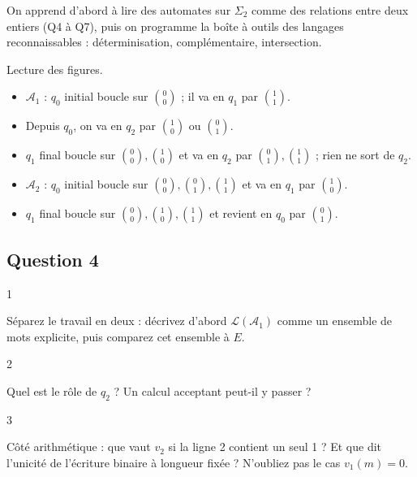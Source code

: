 \documentclass[11pt,a4paper]{article}
\providecommand{\tightlist}{\setlength{\itemsep}{0pt}\setlength{\parskip}{0pt}}
\begin{document}
On apprend d'abord à lire des automates sur \(\Sigma_2\) comme des relations entre deux entiers (Q4 à Q7), puis on programme la boîte à outils des langages reconnaissables : déterminisation, complémentaire, intersection.

Lecture des figures.

\begin{itemize}
\tightlist
\item
  \({\mathcal{A}}_1\) : \(q_0\) initial boucle sur \(\binom00\) ; il va en \(q_1\) par \(\binom11\).
\item
  Depuis \(q_0\), on va en \(q_2\) par \(\binom10\) ou \(\binom01\).
\item
  \(q_1\) final boucle sur \(\binom00,\binom10\) et va en \(q_2\) par \(\binom01,\binom11\) ; rien ne sort de \(q_2\).
\item
  \({\mathcal{A}}_2\) : \(q_0\) initial boucle sur \(\binom00,\binom01,\binom11\) et va en \(q_1\) par \(\binom10\).
\item
  \(q_1\) final boucle sur \(\binom00,\binom10,\binom11\) et revient en \(q_0\) par \(\binom01\).
\end{itemize}

\hypertarget{question-4}{%
\subsection{Question 4}\label{question-4}}

\begin{indication}{1}

Séparez le travail en deux : décrivez d'abord \(\mathcal{L}({\mathcal{A}}_1)\) comme un ensemble de mots explicite, puis comparez cet ensemble à \(E\).

\end{indication}

\begin{indication}{2}

Quel est le rôle de \(q_2\) ? Un calcul acceptant peut-il y passer ?

\end{indication}

\begin{indication}{3}

Côté arithmétique : que vaut \(v_2\) si la ligne 2 contient un seul 1 ? Et que dit l'unicité de l'écriture binaire à longueur fixée ? N'oubliez pas le cas \(v_1(m)=0\).

\end{indication}
\end{document}
